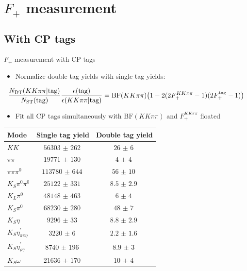 \documentclass{beamer}
\begin{document}
\section{\texorpdfstring{$F_+$}{F+} measurement}
\subsection{With CP tags}
\begin{frame}{$F_+$ measurement with CP tags}
  \begin{itemize}
    \item{Normalize double tag yields with single tag yields:}
  \end{itemize}
  \begin{equation*}
    \frac{N_{\rm DT}(KK\pi\pi|\text{tag})}{N_{\rm ST}(\text{tag})}\frac{\epsilon(\text{tag})}{\epsilon(KK\pi\pi|\text{tag})} = \text{BF}(KK\pi\pi)\big(1 - 2(2F_+^{KK\pi\pi} - 1)(2F_+^{\rm tag} - 1)\big)
  \end{equation*}
  \begin{itemize}
    \item{Fit all CP tags simultaneously with $\text{BF}(KK\pi\pi)$ and $F_+^{KK\pi\pi}$ floated}
  \end{itemize}
  \centering
  \small
  \begin{tabular}{l|c|c}
    Mode                          & Single tag yield & Double tag yield \\
    \hline
    $KK$                          & $\SI{56303(262)}{}$   & $\SI{26(6)}{}$ \\
    $\pi\pi$                      & $\SI{19771(130)}{}$   & $\SI{4(4)}{}$ \\
    $\pi\pi\pi^0$                 & $\SI{113780(644)}{}$  & $\SI{56(10)}{}$ \\
    $K_S\pi^0\pi^0$               & $\SI{25122(331)}{}$   & $\SI{8.5(29)}{}$ \\
    $K_L\pi^0$                    & $\SI{48148(463)}{}$   & $\SI{6(4)}{}$ \\
    \hline
    $K_S\pi^0$                    & $\SI{68230(280)}{}$   & $\SI{48(7)}{}$ \\
    $K_S\eta$                     & $\SI{9296(33)}{}$     & $\SI{8.8(29)}{}$ \\
    $K_S\eta^\prime_{\pi\pi\eta}$ & $\SI{3220(6)}{}$      & $\SI{2.2(16)}{}$ \\
    $K_S\eta^\prime_{\rho\gamma}$ & $\SI{8740(196)}{}$    & $\SI{8.9(30)}{}$ \\
    $K_S\omega$                   & $\SI{21636(170)}{}$   & $\SI{10(4)}{}$ \\
  \end{tabular}
\end{frame}
\end{document}
